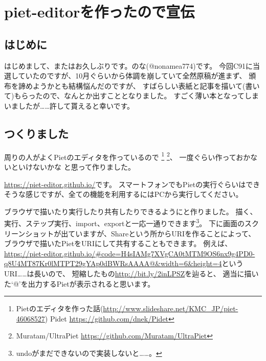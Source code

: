\chapter[piet-editorを作ったので宣伝]{piet-editorを作ったので宣伝}

\section{はじめに}

はじめまして、またはお久しぶりです。のな(@nonamea774)です。
今回C91に当選していたのですが、10月ぐらいから体調を崩していて全然原稿が進まず、
頒布を諦めようかとも結構悩んだのですが、
すばらしい表紙と記事を描いて(書いて)もらったので、なんとか出すこととなりました。
すごく薄い本となってしまいましたが……許して貰えると幸いです。

\section{つくりました}

周りの人がよくPietのエディタを作っているので
\footnote{Pietのエディタを作った話(\url{http://www.slideshare.net/KMC_JP/piet-46068527}) Pidet \url{https://github.com/dnek/Pidet}}
\footnote{Muratam/UltraPiet \url{https://github.com/Muratam/UltraPiet}}、
一度ぐらい作っておかないといけないかな と思って作りました。

\url{https://piet-editor.github.io/}です。
スマートフォンでもPietの実行ぐらいはできそうな感じですが、全ての機能を利用するにはPCから実行してください。

ブラウザで描いたり実行したり共有したりできるようにと作りました。
描く、実行、ステップ実行、import、exportと一応一通りできます\footnote{undoがまだできないので実装しないと……。}。
下に画面のスクリーンショットが出ていますが、Shareという所からURIを作ることによって、
ブラウザで描いたPietをURIにして共有することもできます。
例えば、\href{https://piet-editor.github.io/#code=H4sIAMg7XVgCA0tMTM9OS6nx9g4PD0-q8U4MT87Kr0lMTPT29gYAp0dBWRsAAAA@&width=6&height=4}{https://piet-editor.github.io/\#code=H4sIAMg7XVgCA0tMTM9OS6nx9g4PD0-q8U4MT87Kr0lMTPT29gYAp0dBWRsAAAA@\&width=6\&height=4}というURI……は長いので、
短縮したもの\url{http://bit.ly/2inLPSZ}を辿ると、
適当に描いた`@'を出力するPietが表示されると思います。

